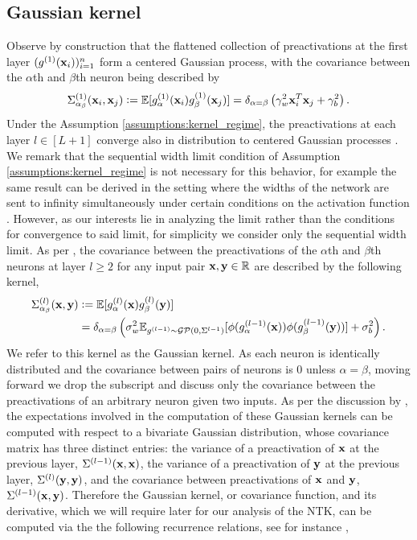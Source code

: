 
\subsection{Gaussian kernel}\label{appendix:background_GK} 

Observe by construction that the flattened collection of preactivations at the first layer $(g^{(1)}(\mathbf x_i))_{i=1}^n$ form a centered Gaussian process, with the covariance between the $\alpha$th and $\beta$th neuron being described by 
\[
\Sigma_{\alpha_\beta}^{(1)}(\mathbf x_i, \mathbf x_j) \vcentcolon= \mathbb{E}[g^{(1)}_{\alpha}(\mathbf x_i) g^{(1)}_{\beta}(\mathbf x_j)] = \delta_{\alpha = \beta} \left( \gamma_w^2 \mathbf x_i^T \mathbf x_j + \gamma_b^2 \right).
\]
Under the Assumption \ref{assumptions:kernel_regime}, the preactivations at each layer $l \in [L+1]$ converge also in distribution to centered Gaussian processes \citep{neal1996, LeeBNSPS18}. We remark that the sequential width limit condition of Assumption \ref{assumptions:kernel_regime} is not necessary for this behavior, for example the same result can be derived in the setting where the widths of the network are sent to infinity simultaneously under certain conditions on the activation function \citep{matthews2018gaussian}. However, as our interests lie in analyzing the limit rather than the conditions for convergence to said limit, for simplicity we consider only the sequential width limit. As per \citet[Eq. 4]{LeeBNSPS18}, the covariance between the preactivations of the $\alpha$th and $\beta$th  neurons at layer $l\geq 2$ for any input pair $\mathbf x, \mathbf y \in \mathbb{R}$ are described by the following kernel,
\[
\begin{aligned}
\Sigma_{\alpha_\beta}^{(l)}(\mathbf x, \mathbf y) & \vcentcolon= \mathbb{E}[g^{(l)}_{\alpha}(\mathbf x) g^{(l)}_{\beta}(\mathbf y)] \\
&=\delta_{\alpha = \beta} \left(\sigma_w^2 \mathbb{E}_{g^{(l-1)} \sim \mathcal{G}\mathcal{P} (0, \Sigma^{l-1})}[\phi(g^{(l-1)}_{\alpha}(\mathbf x)) \phi( g^{(l-1)}_{\beta}(\mathbf y))] + \sigma_b^2\right).
\end{aligned}
\]
We refer to this kernel as the Gaussian kernel. As each neuron is identically distributed and the covariance between pairs of neurons is 0 unless $\alpha = \beta$, moving forward we drop the subscript and discuss only the covariance between the preactivations of an arbitrary neuron given two inputs. As per the discussion by \citet[Section 2.3]{LeeBNSPS18}, the expectations involved in the computation of these Gaussian kernels can be computed with respect to a bivariate Gaussian distribution, whose covariance matrix has three distinct entries: the variance of a preactivation of $\mathbf x$ at the previous layer, $\Sigma^{(l-1)}(\mathbf x, \mathbf x)$, the variance of a preactivation of $\mathbf y$ at the previous layer, $\Sigma^{(l)}(\mathbf y, \mathbf y)$, and the covariance between preactivations of $\mathbf x$ and $\mathbf y$, $\Sigma^{(l-1)}(\mathbf x, \mathbf y)$. Therefore the Gaussian kernel, or covariance function, and its derivative, which we will require later for our analysis of the NTK, can be computed via the the following recurrence relations, see for instance \citep{LeeBNSPS18, jacot_ntk, arora_exact_comp, nguyen_tight_bounds}, 
